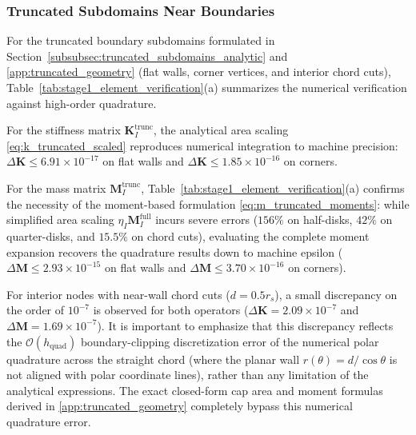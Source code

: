 \documentclass[VANCOUVER,Times1COL]{WileyNJD-v5}
\begin{document}
\subsubsection{Truncated Subdomains Near Boundaries}
For the truncated boundary subdomains formulated in Section~\ref{subsubsec:truncated_subdomains_analytic} and \ref{app:truncated_geometry} (flat walls, corner vertices, and interior chord cuts), Table~\ref{tab:stage1_element_verification}(a) summarizes the numerical verification against high-order quadrature.

For the stiffness matrix $\mathbf{K}_I^{\mathrm{trunc}}$, the analytical area scaling \eqref{eq:k_truncated_scaled} reproduces numerical integration to machine precision: $\Delta \mathbf{K} \le 6.91 \times 10^{-17}$ on flat walls and $\Delta \mathbf{K} \le 1.85 \times 10^{-16}$ on corners.

For the mass matrix $\mathbf{M}_I^{\mathrm{trunc}}$, Table~\ref{tab:stage1_element_verification}(a) confirms the necessity of the moment-based formulation \eqref{eq:m_truncated_moments}: while simplified area scaling $\eta_I \mathbf{M}_I^{\mathrm{full}}$ incurs severe errors ($156\%$ on half-disks, $42\%$ on quarter-disks, and $15.5\%$ on chord cuts), evaluating the complete moment expansion recovers the quadrature results down to machine epsilon ($\Delta \mathbf{M} \le 2.93 \times 10^{-15}$ on flat walls and $\Delta \mathbf{M} \le 3.70 \times 10^{-16}$ on corners).

For interior nodes with near-wall chord cuts ($d = 0.5 r_s$), a small discrepancy on the order of $10^{-7}$ is observed for both operators ($\Delta \mathbf{K} = 2.09 \times 10^{-7}$ and $\Delta \mathbf{M} = 1.69 \times 10^{-7}$). It is important to emphasize that this discrepancy reflects the $\mathcal{O}(h_{\mathrm{quad}})$ boundary-clipping discretization error of the numerical polar quadrature across the straight chord (where the planar wall $r(\theta) = d/\cos\theta$ is not aligned with polar coordinate lines), rather than any limitation of the analytical expressions. The exact closed-form cap area and moment formulas derived in \ref{app:truncated_geometry} completely bypass this numerical quadrature error.
\end{document}
